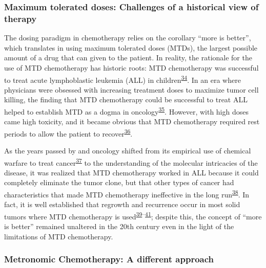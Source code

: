 \documentclass[11pt]{umnthesis}
\begin{document}
\hypertarget{maximum-tolerated-doses-challenges-of-a-historical-view-of-therapy}{%
\subsubsection{Maximum tolerated doses: Challenges of a historical view of therapy}\label{maximum-tolerated-doses-challenges-of-a-historical-view-of-therapy}}

The dosing paradigm in chemotherapy relies on the corollary ``more is better'', which translates in using maximum tolerated doses (MTDs), the largest possible amount of a drug that can given to the patient. In reality, the rationale for the use of MTD chemotherapy has historic roots: MTD chemotherapy was successful to treat acute lymphoblastic leukemia (ALL) in children\textsuperscript{\protect\hyperlink{ref-skipper1970}{34}}. In an era where physicians were obsessed with increasing treatment doses to maximize tumor cell killing, the finding that MTD chemotherapy could be successful to treat ALL helped to establish MTD as a dogma in oncology\textsuperscript{\protect\hyperlink{ref-mukherjee2010}{35}}. However, with high doses came high toxicity, and it became obvious that MTD chemotherapy required rest periods to allow the patient to recover\textsuperscript{\protect\hyperlink{ref-benzekry2013}{36}}.

As the years passed by and oncology shifted from its empirical use of chemical warfare to treat cancer\textsuperscript{\protect\hyperlink{ref-porrata2001}{37}} to the understanding of the molecular intricacies of the disease, it was realized that MTD chemotherapy worked in ALL because it could completely eliminate the tumor clone, but that other types of cancer had characteristics that made MTD chemotherapy ineffective in the long run\textsuperscript{\protect\hyperlink{ref-kareva2015}{38}}. In fact, it is well established that regrowth and recurrence occur in most solid tumors where MTD chemotherapy is used\textsuperscript{\protect\hyperlink{ref-andre2011}{39}--\protect\hyperlink{ref-pasquier2010}{41}}; despite this, the concept of ``more is better'' remained unaltered in the 20th century even in the light of the limitations of MTD chemotherapy.

\hypertarget{metronomic-chemotherapy-a-different-approach}{%
\subsubsection{Metronomic Chemotherapy: A different approach}\label{metronomic-chemotherapy-a-different-approach}}
\end{document}
